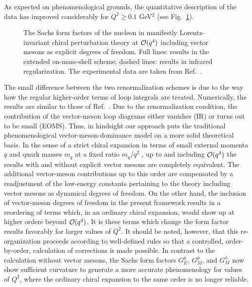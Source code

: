 \documentclass[twoside,12pt]{article}
\begin{document}
   As expected on phenomenological grounds, the quantitative description of the
data has improved considerably for $Q^2\geq 0.1$ GeV$^2$   (see
Fig.~\ref{H1:emff:G:neu}).
\begin{figure}[t]
\begin{center}
\caption{\label{H1:emff:G:neu} The Sachs form factors of the nucleon
in manifestly Lorentz-invariant chiral perturbation theory at ${\cal
O}(q^4)$ including vector mesons as explicit degrees of freedom.
Full lines: results in the extended on-mass-shell scheme; dashed
lines: results in infrared regularization. The experimental data are
taken from Ref.\ \cite{Friedrich:2003iz}.}
\end{center}
\end{figure}
   The small difference between the two renormalization schemes is due to the
way how the regular higher-order terms of loop integrals are treated.
   Numerically, the results are similar to those of Ref.\ \cite{Kubis:2000zd}.
   Due to the renormalization condition, the contribution of the vector-meson
loop diagrams either vanishes (IR) or turns out to be small (EOMS).
   Thus, in hindsight our approach puts the traditional phenomenological
vector-meson-dominance model on a more solid theoretical basis.
   In the sense of a strict chiral expansion in terms of small external momenta $q$ and
quark masses $m_q$ at a fixed ratio $m_q/q^2$ \cite{Gasser:1983yg}, up to and including
${\cal O}(q^4)$ the results with and without explicit vector mesons are completely equivalent.
   The additional vector-meson contributions up to this order are
compensated by a readjustment of the low-energy constants pertaining to the
theory including vector mesons as dynamical degrees of freedom.
   On the other hand, the inclusion of vector-meson degrees of freedom in the present
framework results in a reordering of terms which, in an ordinary chiral
expansion, would show up at higher orders beyond ${\cal O}(q^4)$.
   It is these terms which change the form factor results favorably for larger
values of $Q^2$.
   It should be noted, however, that this re-organization proceeds according to
well-defined rules so that a controlled, order-by-order, calculation of
corrections is made possible.
   In contrast to the calculation without vector mesons, the Sachs form factors
$G_E^p$, $G_M^p$, and $G_M^n$ now show sufficient curvature to generate a more
accurate  phenomenology for values of $Q^2$, where the ordinary chiral expansion
to the same order is no longer reliable.
\end{document}
